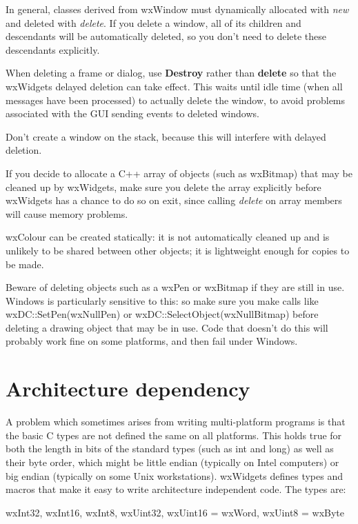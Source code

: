 In general, classes derived from wxWindow must dynamically allocated
with {\it new} and deleted with {\it delete}. If you delete a window,
all of its children and descendants will be automatically deleted,
so you don't need to delete these descendants explicitly.

When deleting a frame or dialog, use {\bf Destroy} rather than {\bf delete} so
that the wxWidgets delayed deletion can take effect. This waits until idle time
(when all messages have been processed) to actually delete the window, to avoid
problems associated with the GUI sending events to deleted windows.

Don't create a window on the stack, because this will interfere
with delayed deletion.

If you decide to allocate a C++ array of objects (such as wxBitmap) that may
be cleaned up by wxWidgets, make sure you delete the array explicitly
before wxWidgets has a chance to do so on exit, since calling {\it delete} on
array members will cause memory problems.

wxColour can be created statically: it is not automatically cleaned
up and is unlikely to be shared between other objects; it is lightweight
enough for copies to be made.

Beware of deleting objects such as a wxPen or wxBitmap if they are still in use.
Windows is particularly sensitive to this: so make sure you
make calls like wxDC::SetPen(wxNullPen) or wxDC::SelectObject(wxNullBitmap) before deleting
a drawing object that may be in use. Code that doesn't do this will probably work
fine on some platforms, and then fail under Windows.

\section{Architecture dependency}\label{architecturedependency}

A problem which sometimes arises from writing multi-platform programs is that
the basic C types are not defined the same on all platforms. This holds true
for both the length in bits of the standard types (such as int and long) as 
well as their byte order, which might be little endian (typically
on Intel computers) or big endian (typically on some Unix workstations). wxWidgets
defines types and macros that make it easy to write architecture independent
code. The types are:

wxInt32, wxInt16, wxInt8, wxUint32, wxUint16 = wxWord, wxUint8 = wxByte


